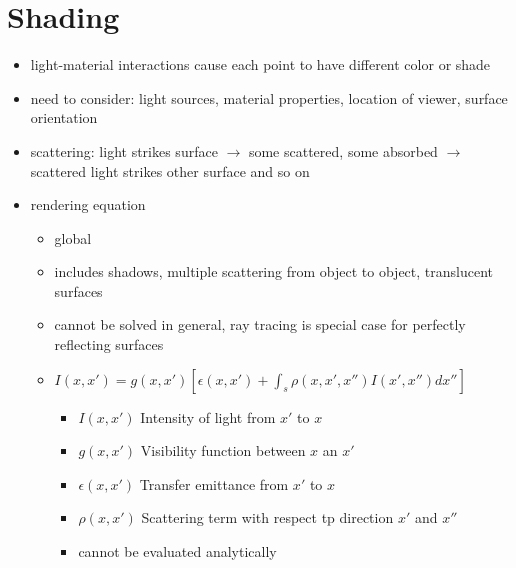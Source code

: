 \documentclass[11pt,a4paper]{article}
\begin{document}
\section{Shading}
\begin{itemize}
	\item light-material interactions cause each point to have different color or shade
	\item need to consider: light sources, material properties, location of viewer, surface orientation
	\item scattering: light strikes surface $\rightarrow$ some scattered, some absorbed $\rightarrow$  scattered light strikes other surface and so on
	\item rendering equation
	\begin{itemize} 
		\item global
		\item includes shadows, multiple scattering from object to object, translucent surfaces
		\item cannot be solved in general, ray tracing is special case for perfectly reflecting surfaces
		\item $I(x,x')=g(x,x')[ \epsilon (x,x')+ \int_s \rho (x,x',x'')I(x',x'')dx'']$
		\begin{itemize}
			\item $I(x,x')$ Intensity of light from $x'$ to $x$
			\item $g(x,x')$ Visibility function between $x$ an $x'$
			\item $\epsilon(x,x')$ Transfer emittance from $x'$ to $x$
			\item $\rho(x,x')$ Scattering term with respect tp direction $x'$ and $x''$
			\item cannot be evaluated analytically
		\end{itemize}
	

\end{itemize}
\end{itemize}
\end{document}
